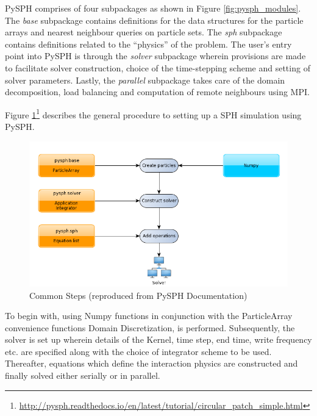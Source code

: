 PySPH comprises of four subpackages as shown in Figure \ref{fig:pysph_modules}. The \textit{base} subpackage contains definitions for the data structures for the particle arrays and nearest neighbour queries on particle sets. The \textit{sph} subpackage contains definitions related to the ``physics'' of the problem. The user's entry point into PySPH is through the  \textit{solver} subpackage wherein provisions are made to facilitate solver construction, choice of the time-stepping scheme and setting of solver parameters. Lastly, the \textit{parallel} subpackage takes care of the domain decomposition, load balancing and computation of remote neighbours using MPI.

Figure \ref{fig:sph_algo}\footnote[9]{\url{http://pysph.readthedocs.io/en/latest/tutorial/circular_patch_simple.html}} describes the general procedure to setting up a SPH simulation using PySPH.  

\begin{figure}[htb!]
\centering
\setlength\fboxsep{0pt}
      \includegraphics[scale=0.5]{figures/pysph-examples-common-steps.png} 
\caption{{\small{Common Steps (reproduced from PySPH Documentation)}}}
\label{fig:sph_algo}
\end{figure}

To begin with, using Numpy functions in conjunction with the ParticleArray convenience functions Domain Discretization, is performed. Subsequently, the solver is set up wherein details of the Kernel, time step, end time, write frequency etc. are specified along with the choice of integrator scheme to be used. Thereafter, equations which define the interaction physics are constructed and finally solved either serially or in parallel. 
